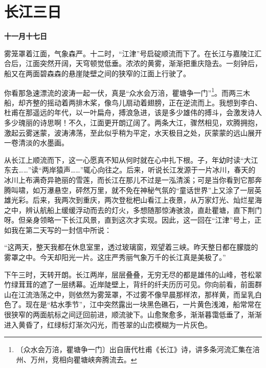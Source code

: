 \documentclass[12pt,UTF-8,openany]{ctexbook}
\begin{document}
\chapter{长江三日}

\begin{large}
    
    \textbf{十一月十七日}
    
    雾笼罩着江面，气象森严。十二时，“江津”号启碇顺流而下了。在长江与嘉陵江汇合后，江面突然开阔，天穹顿觉低垂。浓浓的黄雾，渐渐把重庆隐去。一刻钟后，船又在两面碧森森的悬崖陡壁之间的狭窄的江面上行驶了。
    
    你看那急速漂流的波涛一起一伏，真是“众水会万涪，瞿塘争一门”\footnote{〔众水会万涪，瞿塘争一门〕出自唐代杜甫《长江》诗，讲多条河流汇集在涪州、万州，竞相向瞿塘峡奔腾流去。}。而两三木船，却齐整的摇动着两排木桨，像鸟儿扇动着翅膀，正在逆流而上。我想到李白、杜甫在那遥远的年代，以一叶扁舟，搏浪急进，该是多少雄伟的搏斗，会激发诗人多少瑰丽的诗思啊！不久，江面更开朗辽阔了。两条大江，骤然相见，欢腾拥抱，激起云雾迷蒙，波涛沸荡，至此似乎稍为平定，水天极目之处，灰蒙蒙的远山展开一卷清淡的水墨画。
    
    从长江上顺流而下，这一心愿真不知从何时就在心中扎下根。子，年幼时读“大江东去……”读“两岸猿声……”辄心向往之。后来，听说长江发源于一片冰川，春天的冰川上布满奇异艳丽的雪莲，而长江在那儿不过是一泓清溪；可是当你看到它那奔腾叫啸，如万瀑悬空，砰然万里，就不免在神秘气氛的“童话世界”上又涂了一层英雄光彩。后来，我两次到重庆，两次登枇杷山看江上夜景，从万家灯光、灿烂星海之中，辨认航船上缓缓浮动而去的灯火，多想随那惊涛骇浪，直赴瞿塘，直下荆门呀。但亲身领略一下长江风景，直到这次才实现。因此，这一回在“江津”号上，正如我在第二天写的一封信中所说：
    
    “这两天，整天我都在休息室里，透过玻璃窗，观望着三峡。昨天整日都在朦胧的雾罩之中。今天却阳光一片。这庄严秀丽气象万千的长江真是美极了。”
    
    下午三时，天转开朗。长江两岸，层层叠叠，无穷无尽的都是雄伟的山峰，苍松翠竹绿茸茸的遮了一层绣幕。近岸陡壁上，背纤的纤夫历历可见。你向前看，前面群山在江流浩荡之中，则依然为雾笼罩，不过雾不像早晨那样浓，那样黄，而呈乳白色了。现在是“枯水季节”，江中突然露出一块黑色礁石，一片黄色浅滩，船常常在很狭窄的两面航标之间迂回前进，顺流驶下。山愈聚愈多，渐渐暮霭低垂了，渐渐进入黄昏了，红绿标灯渐次闪光，而苍翠的山峦模糊为一片灰色。
    

\end{large}
\end{document}
